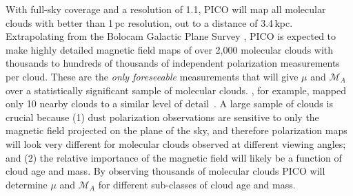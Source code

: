 \documentclass[PICOReport.tex]{subfiles}
\begin{document}
With full-sky coverage and a resolution of 1.1\arcmin, PICO will map all molecular clouds with better than 1\,pc resolution, out to a distance of 3.4\,kpc.  Extrapolating from the Bolocam Galactic Plane Survey \citep[BGPS,][]{EllsworthBowers2015}, PICO is expected to make highly detailed magnetic field maps of over 2,000 molecular clouds with thousands to hundreds of thousands of independent polarization measurements per cloud. These are the {\it only foreseeable} measurements that will give $\mu$ and $\mathcal{M}_A$ over a statistically significant sample of molecular clouds. \planck , for example, mapped only 10 nearby clouds to a similar level of detail~\citep{Planck:XXXV}. A large sample of clouds is crucial because (1) dust polarization observations are sensitive to only the magnetic field projected on the plane of the sky, and therefore polarization maps will look very different for molecular clouds observed at different viewing angles; and (2) the relative importance of the magnetic field will likely be a function of cloud age and mass. By observing thousands of molecular clouds PICO will determine $\mu$ and  $\mathcal{M}_A$ for different sub-classes of cloud age and mass. 

\end{document}
